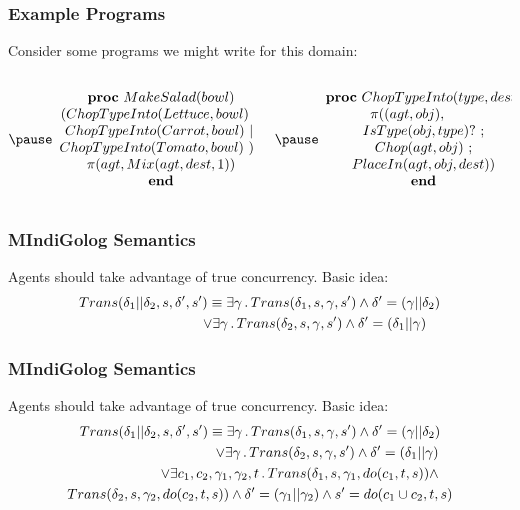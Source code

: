 \documentclass{beamer}
\begin{document}
\begin{frame}
\frametitle{Example Programs}

Consider some programs we might write for this domain:

\begin{columns}
  \begin{column}{0.5\textwidth}
\[
\pause
\begin{array}{c}
\mathbf{proc}\ MakeSalad(bowl)\\
(ChopTypeInto(Lettuce,bowl)\ ||\\
ChopTypeInto(Carrot,bowl)\ ||\\
ChopTypeInto(Tomato,bowl)\ )\ ;\\
\pi(agt, Mix(agt,dest,1))\\
\mathbf{end}\end{array}\]
  \end{column}
  \begin{column}{0.5\textwidth}
\[
\pause
\begin{array}{c}
\mathbf{proc}\ ChopTypeInto(type,dest)\\
\pi((agt,obj), \ \ \ \ \ \ \ \\
IsType(obj,type)?\ ;\\
Chop(agt,obj)\ ;\\
PlaceIn(agt,obj,dest))\\
\mathbf{end}\end{array}\]
  \end{column}
\end{columns}
\end{frame}

\begin{frame}
\frametitle{MIndiGolog Semantics}
Agents should take advantage of true concurrency. Basic idea:
\begin{multline*}
Trans(\delta_{1}||\delta_{2},s,\delta',s')\equiv\exists\gamma\,.\, Trans(\delta_{1},s,\gamma,s')\wedge\delta'=(\gamma||\delta_{2})\\
\shoveright{\vee\exists\gamma\,.\, Trans(\delta_{2},s,\gamma,s')\wedge\delta'=(\delta_{1}||\gamma)}\\
\end{multline*}
\end{frame}

\begin{frame}
\frametitle{MIndiGolog Semantics}
Agents should take advantage of true concurrency. Basic idea:
\begin{multline*}
Trans(\delta_{1}||\delta_{2},s,\delta',s')\equiv\exists\gamma\,.\, Trans(\delta_{1},s,\gamma,s')\wedge\delta'=(\gamma||\delta_{2})\\
\shoveright{\vee\exists\gamma\,.\, Trans(\delta_{2},s,\gamma,s')\wedge\delta'=(\delta_{1}||\gamma)}\\
\shoveright{\vee\exists c_{1},c_{2},\gamma_{1},\gamma_{2},t\,.\, Trans(\delta_{1},s,\gamma_{1},do(c_{1},t,s))\wedge}\\ 
Trans(\delta_{2},s,\gamma_{2},do(c_{2},t,s))\wedge\delta'=(\gamma_{1}||\gamma_{2})\wedge s'=do(c_{1}\cup c_{2},t,s)
\end{multline*}
\end{frame}
\end{document}
